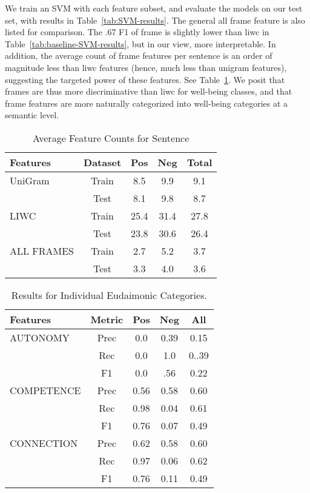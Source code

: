 \documentclass[11pt,letterpaper]{article}
\begin{document}
We train an SVM with each feature subset, and evaluate the models on
our test set, with results in Table~\ref{tab:SVM-results}. The general
{\sc all frame} feature is also listed for comparison. The .67 F1 of
{\sc frame} is slightly lower than {\sc liwc} in
Table~\ref{tab:baseline-SVM-results}, but in our view, more
interpretable.  In addition, the average count of {\sc frame} features
per sentence is an order of magnitude less than {\sc liwc} features
(hence, much less than unigram features), suggesting the targeted
power of these features.  See Table~\ref{tab:feature-counts}. We posit
that {\sc frames} are thus more discriminative than {\sc liwc} for
well-being classes, and that {\sc frame} features are
more naturally categorized into  well-being categories at a semantic
level.

\begin{table}[h!t]
\footnotesize
\centering
\begin{tabularx}{2.8in}{p{0.8in}| c| c c |  c}
\toprule
\bf Features & \bf Dataset & \bf Pos & \bf Neg & \bf Total \\
\midrule
 UniGram &  Train &  8.5  & 9.9 &  9.1  \\
         &  Test & 8.1 & 9.8  & 8.7 \\
 \midrule
 LIWC &  Train & 25.4 & 31.4 &  27.8  \\
      &  Test & 23.8 & 30.6 & 26.4  \\
 \midrule
 ALL FRAMES &  Train & 2.7 & 5.2 & 3.7  \\
      &  Test & 3.3 & 4.0 & 3.6  \\
 \bottomrule
 \end{tabularx}
 \caption{\label{tab:feature-counts} Average Feature Counts for Sentence}
 \end{table}


\begin{table}[h!t]
\footnotesize
\centering
\begin{tabularx}{2.8in}{p{0.85in}| c| c c  c}
\toprule
\bf Features & \bf Metric & \bf Pos & \bf Neg & \bf All  \\
\midrule 
AUTONOMY &  Prec &  0.0  & 0.39 &  0.15  \\
        &  Rec & 0.0 & 1.0  & 0..39\\ 
        &  F1 &  0.0 & .56 & 0.22 \\
\midrule 
COMPETENCE &  Prec & 0.56 & 0.58 & 0.60  \\
     &  Rec & 0.98 & 0.04 & 0.61  \\
     &  F1 & 0.76 & 0.07 &  0.49 \\
\midrule 
CONNECTION&  Prec & 0.62 & 0.58 & 0.60  \\
     &  Rec & 0.97 & 0.06 & 0.62  \\
     &  F1 & 0.76 & 0.11 &  0.49 \\
\bottomrule
\end{tabularx}
\caption{\label{tab:EUD-SVM-results} Results for Individual Eudaimonic Categories. }
\end{table}  
\end{document}
